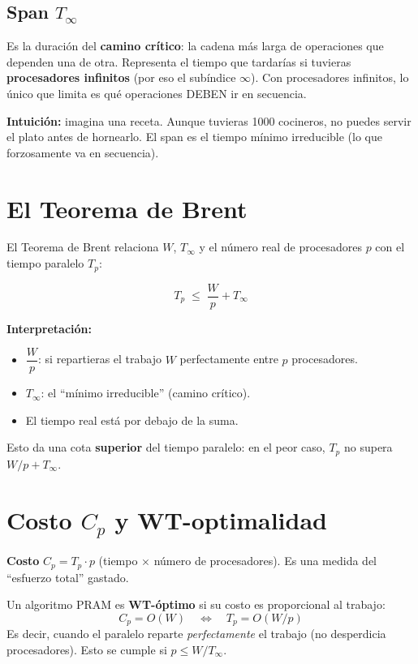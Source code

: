 \documentclass[11pt,a4paper]{article}
\newcommand{\term}[1]{\textbf{\textcolor{clave}{#1}}}
\begin{document}
\subsection{Span $T_\infty$}
Es la duración del \textbf{camino crítico}: la cadena más larga de operaciones
que dependen una de otra. Representa el tiempo que tardarías si tuvieras
\textbf{procesadores infinitos} (por eso el subíndice $\infty$). Con procesadores
infinitos, lo único que limita es qué operaciones DEBEN ir en secuencia.

\textbf{Intuición:} imagina una receta. Aunque tuvieras 1000 cocineros, no
puedes servir el plato antes de hornearlo. El span es el tiempo mínimo
irreducible (lo que forzosamente va en secuencia).

\section{El Teorema de Brent}

El Teorema de Brent relaciona $W$, $T_\infty$ y el número real de procesadores
$p$ con el tiempo paralelo $T_p$:

\[
\boxed{T_p \;\le\; \frac{W}{p} + T_\infty}
\]

\textbf{Interpretación:}
\begin{itemize}
  \item $\dfrac{W}{p}$: si repartieras el trabajo $W$ perfectamente entre $p$
        procesadores.
  \item $T_\infty$: el ``mínimo irreducible'' (camino crítico).
  \item El tiempo real está por debajo de la suma.
\end{itemize}

Esto da una cota \textbf{superior} del tiempo paralelo: en el peor caso, $T_p$
no supera $W/p + T_\infty$.

\section{Costo $C_p$ y WT-optimalidad}

\term{Costo} $C_p = T_p \cdot p$ (tiempo $\times$ número de procesadores). Es una
medida del ``esfuerzo total'' gastado.

Un algoritmo PRAM es \term{WT-óptimo} si su costo es proporcional al trabajo:
\[
C_p = O(W) \quad\Longleftrightarrow\quad T_p = O(W/p)
\]
Es decir, cuando el paralelo reparte \emph{perfectamente} el trabajo (no desperdicia
procesadores). Esto se cumple si $p \le W/T_\infty$.
\end{document}
